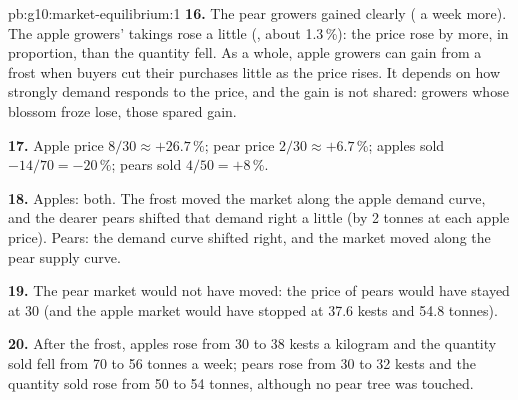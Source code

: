 \begin{solution}{pb:g10:market-equilibrium:1}
\textbf{16.} The pear growers gained clearly ( a week more). The apple growers' takings rose a little (, about 1.3\,\%): the price
rose by more, in proportion, than the quantity fell. As a whole, apple growers can gain from a frost when buyers cut their purchases little as the price
rises. It depends on how strongly demand responds to the price, and the gain is not shared: growers whose blossom froze lose, those spared gain.

\textbf{17.} Apple price $8/30 \approx +26.7\,\%$; pear price $2/30 \approx +6.7\,\%$; apples sold $-14/70 = -20\,\%$; pears sold $4/50 = +8\,\%$.

\textbf{18.} Apples: both. The frost moved the market along the apple demand curve, and the dearer pears shifted that demand right a little (by 2 tonnes at
each apple price). Pears: the demand curve shifted right, and the market moved along the pear supply curve.

\textbf{19.} The pear market would not have moved: the price of pears would have stayed at 30 (and the apple market would have stopped at 37.6 kests and 54.8
tonnes).

\textbf{20.} After the frost, apples rose from 30 to 38 kests a kilogram and the quantity sold fell from 70 to 56 tonnes a week; pears rose from 30 to 32
kests and the quantity sold rose from 50 to 54 tonnes, although no pear tree was touched.
\end{solution}
